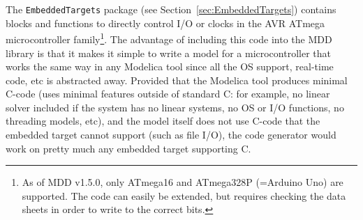\documentclass{resources/modelica}
\newcommand{\modelica}[1]{\lstinline[language=modelica]|#1|}
\begin{document}

The \modelica{EmbeddedTargets} package (see Section~\ref{sec:EmbeddedTargets}) contains
blocks and functions to directly control I/O or clocks in the AVR ATmega microcontroller family\footnote{As of MDD
v1.5.0, only ATmega16 and ATmega328P (=Arduino Uno) are supported.
The code can easily be extended, but requires checking the data sheets in order
to write to the correct bits.}.
The advantage of including this code into the MDD library is that it makes it
simple to write a model for a microcontroller that works the same way
in any Modelica tool since all the OS support, real-time code, etc is
abstracted away.
Provided that the Modelica tool produces minimal C-code (uses minimal features
outside of standard C: for example, no linear solver included if the system has no linear systems,
no OS or I/O functions, no threading models, etc),
and the model itself does not use C-code that the embedded target cannot support
(such as file I/O), the code generator would work on pretty much any embedded
target supporting C.
\end{document}
